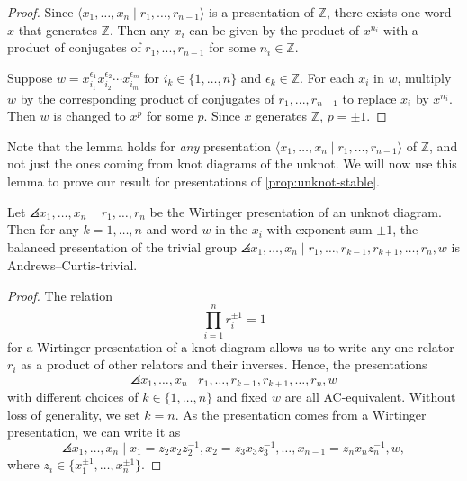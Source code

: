 {\begin{proof}[Proof]
    Since $\langle x_1,\ldots, x_n \mid r_1,\ldots,r_{n-1}\rangle$ is a presentation of $\mathbb{Z}$, there exists one word $x$ that generates $\mathbb{Z}$. Then any $x_i$ can be given by the product of $x^{n_i}$ with a product of conjugates of $r_1,...,r_{n-1}$ for some $n_i\in\mathbb{Z}$.

Suppose $w=x_{i_1}^{\epsilon_ 1}x_{i_2}^{\epsilon_2}\cdots x_{i_m}^{\epsilon_m}$ for $i_k\in \{1,\ldots,n\}$ and $\epsilon_k\in\mathbb{Z}$. For each $x_i$ in $w$, multiply $w$ by the corresponding product of conjugates of $r_1,...,r_{n-1}$ to replace $x_i$ by $x^{n_i}$. Then $w$ is changed to $x^p$ for some $p$. Since $x$ generates $\mathbb{Z}$, $p=\pm 1$. 
\end{proof}

Note that the lemma holds for \emph{any} presentation $\langle x_1,\ldots, x_n \mid r_1,\ldots,r_{n-1}\rangle$ of $\mathbb{Z}$, and not just the ones coming from knot diagrams of the unknot. We will now use this lemma to prove our result for presentations of \autoref{prop:unknot-stable}.

\begin{theorem} \label{prop:unknot}
    Let $\angles{ x_1,\ldots, x_n\, \mid \, r_1, \ldots, r_n }$ be the Wirtinger presentation of an unknot diagram. Then for any $k=1,\ldots,n$ and word $w$ in the $x_i$ with exponent sum $\pm 1$, the balanced presentation of the trivial group $\angles{ x_1,\ldots, x_n \mid r_1,\ldots, r_{k-1}, r_{k+1},\ldots, r_n, w}$ is Andrews--Curtis-trivial.
\end{theorem}

\begin{proof}
The relation  $$\prod\limits_{i=1}^nr_i^{\pm1}=1$$ for a Wirtinger presentation of a knot diagram allows us to write any one relator $r_i$ as a product of other relators and their inverses. Hence, the presentations 
$$\angles{x_1, \ldots, x_n \mid r_1, \ldots, r_{k-1}, r_{k+1}, \ldots, r_n, w}$$ with different choices of $k \in \{1, \ldots, n\}$ and fixed $w$ are all AC-equivalent. Without loss of generality, we set $k=n$. As the presentation comes from a Wirtinger presentation, we can write it as 
\[
\angles{ x_1,\ldots,x_n \mid x_1=z_2x_2z_2^{-1}, x_2=z_3x_3z_3^{-1},\ldots, x_{n-1}=z_{n}x_nz_{n}^{-1}, w },
\]
where $z_i\in \{x_1^{\pm 1},\ldots, x_n^{\pm 1}\}$. 


\end{proof}}
